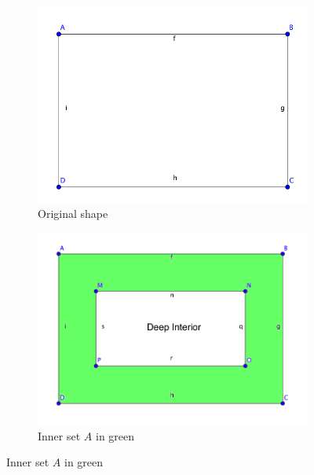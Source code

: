 \documentclass[12pt]{article}
\theoremstyle{definition}
\begin{document}
\begin{figure}[!htb]
\centering
\begin{subfigure}[b]{.4\linewidth}
\includegraphics[width=\linewidth]{original_shape}
\caption{Original shape}\label{fig:mouse}
\end{subfigure}\hspace{20 mm}
\begin{subfigure}[b]{.4\linewidth}
\includegraphics[width=\linewidth]{inner_boundary}
\caption{Inner set $A$ in green}\label{fig:gull}
\end{subfigure}


\end{figure}
\end{document}
